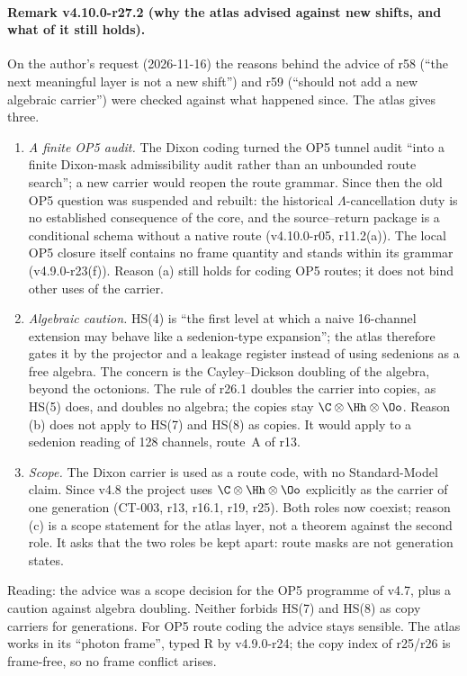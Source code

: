 \paragraph{Remark v4.10.0-r27.2 (why the atlas advised against new shifts, and what of it still holds).}
On the author's request (2026-11-16) the reasons behind the advice of r58 (``the next meaningful layer is not a new shift'') and r59
(``should not add a new algebraic carrier'') were checked against what happened since.  The atlas gives three.
\begin{enumerate}[leftmargin=2em]
\item[(a)] \emph{A finite OP5 audit.}  The Dixon coding turned the OP5 tunnel audit ``into a finite Dixon-mask admissibility audit rather
than an unbounded route search''; a new carrier would reopen the route grammar.  Since then the old OP5 question was suspended and rebuilt:
the historical \(\Lambda\)-cancellation duty is no established consequence of the core, and the source--return package is a conditional
schema without a native route (v4.10.0-r05, r11.2(a)).  The local OP5 closure itself contains no frame quantity and stands within its
grammar (v4.9.0-r23(f)).  Reason (a) still holds for coding OP5 routes; it does not bind other uses of the carrier.
\item[(b)] \emph{Algebraic caution.}  HS(4) is ``the first level at which a naive 16-channel extension may behave like a sedenion-type
expansion''; the atlas therefore gates it by the projector and a leakage register instead of using sedenions as a free algebra.  The
concern is the Cayley--Dickson doubling of the algebra, beyond the octonions.  The rule of r26.1 doubles the carrier into copies, as HS(5)
does, and doubles no algebra; the copies stay \(\C\otimes\Hh\otimes\Oo\).  Reason (b) does not apply to HS(7) and HS(8) as copies.  It would
apply to a sedenion reading of 128 channels, route~A of r13.
\item[(c)] \emph{Scope.}  The Dixon carrier is used as a route code, with no Standard-Model claim.  Since v4.8 the project uses
\(\C\otimes\Hh\otimes\Oo\) explicitly as the carrier of one generation (CT-003, r13, r16.1, r19, r25).  Both roles now coexist; reason (c) is a
scope statement for the atlas layer, not a theorem against the second role.  It asks that the two roles be kept apart: route masks are not
generation states.
\end{enumerate}
Reading: the advice was a scope decision for the OP5 programme of v4.7, plus a caution against algebra doubling.  Neither forbids HS(7)
and HS(8) as copy carriers for generations.  For OP5 route coding the advice stays sensible.  The atlas works in its ``photon frame'',
typed R by v4.9.0-r24; the copy index of r25/r26 is frame-free, so no frame conflict arises.

